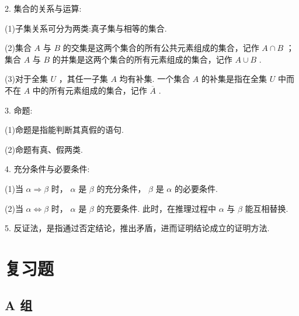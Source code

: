 \documentclass[a4paper,10pt,oneside,fontset=none]{ctexbook}
\numberwithin{equation}{chapter}
\begin{document}
2. 集合的关系与运算:

(1)子集关系可分为两类:真子集与相等的集合.

(2)集合 $A$ 与 $B$ 的交集是这两个集合的所有公共元素组成的集合，记作 $A \cap  B$ ；集合 $A$ 与 $B$ 的并集是这两个集合的所有元素组成的集合，记作 $A \cup  B$ .

(3)对于全集 $U$ ，其任一子集 $A$ 均有补集. 一个集合 $A$ 的补集是指在全集 $U$ 中而不在 $A$ 中的所有元素组成的集合，记作 $\overline{A}$ .

3. 命题:

(1)命题是指能判断其真假的语句.

(2)命题有真、假两类.

4. 充分条件与必要条件:

(1)当 $\alpha  \Rightarrow  \beta$ 时， $\alpha$ 是 $\beta$ 的充分条件， $\beta$ 是 $\alpha$ 的必要条件.

(2)当 $\alpha  \Leftrightarrow  \beta$ 时， $\alpha$ 是 $\beta$ 的充要条件. 此时，在推理过程中 $\alpha$ 与 $\beta$ 能互相替换.

5. 反证法，是指通过否定结论，推出矛盾，进而证明结论成立的证明方法.

\section*{复习题}

\subsection*{A 组}
\end{document}
